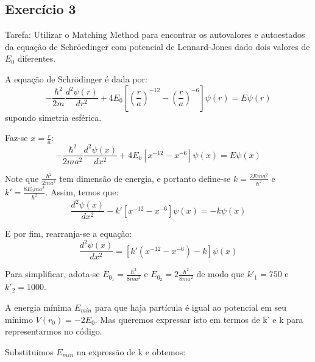\documentclass[12pt, a4paper]{article} %
\begin{document}
        \subsection{Exerc\'icio 3}

            Tarefa: Utilizar o Matching Method para encontrar os autovalores e autoestados da equa\c{c}\~ao de Schr\"oedinger com potencial de Lennard-Jones dado dois valores de $E_{0}$ diferentes.

            A equa\c{c}\~ao de Schr\"odinger \'e dada por:
            \begin{equation*}
                -\frac{\hbar^{2}}{2m} \frac{d^{2}\psi(r)}{dr^{2}} + 4E_{0} \left[ \left( \frac{r}{a} \right)^{-12} - \left( \frac{r}{a} \right)^{-6} \right]\psi(r) = E\psi(r)
            \end{equation*}
            supondo simetria esf\'erica.

            Faz-se $x = \frac{r}{a}$:
            \begin{equation*}
                -\frac{\hbar^{2}}{2ma^2} \frac{d^{2}\psi(x)}{dx^{2}} + 4E_{0} \left[ x^{-12} - x^{-6} \right]\psi(x) = E\psi(x)
            \end{equation*}

            Note que $\frac{\hbar^{2}}{2ma^2}$ tem dimens\~ao de energia, e portanto define-se $k = \frac{2Ema^2}{\hbar^{2}}$ e $k' = \frac{8E_{0}ma^2}{\hbar^{2}}$. Assim, temos que:
            \begin{equation*}
                \frac{d^{2}\psi(x)}{dx^{2}} - k'\left[  x^{-12} - x^{-6} \right]\psi(x) = -k\psi(x)
            \end{equation*}

            E por fim, rearranja-se a equa\c{c}\~ao:
            \begin{equation*}
                \frac{d^{2}\psi(x)}{dx^{2}} = \left[k'\left( x^{-12} - x^{-6} \right) -k\right]\psi(x)
            \end{equation*}

            Para simplificar, adota-se $E_{0_{1}} = \frac{\hbar^{2}}{8ma^2}$ e $E_{0_{2}} = 2\frac{\hbar^{2}}{8ma^2}$ de modo que $k'_{1} = 750$ e $k'_{2} = 1000$.

            A energia mínima $E_{min}$ para que haja partícula \'e igual ao potencial em seu m\'inimo $V(r_{0}) = -2E_{0}$. Mas queremos expressar isto em termos de k' e k para representarmos no c\'odigo.
            
            Substituimos $E_{min}$ na expressão de k e obtemos:
\end{document}

